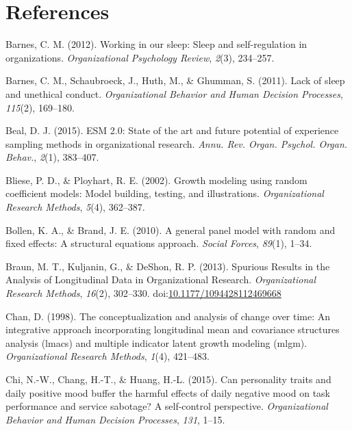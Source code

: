 \documentclass[english,,man]{apa6}
\theoremstyle{definition}
\theoremstyle{definition}
\theoremstyle{definition}
\theoremstyle{remark}
\begin{document}
\newpage

\hypertarget{references}{%
\section{References}\label{references}}

\setlength{\parindent}{-0.5in}
\setlength{\leftskip}{0.5in}

\hypertarget{refs}{}
\leavevmode\hypertarget{ref-barnes2012working}{}%
Barnes, C. M. (2012). Working in our sleep: Sleep and self-regulation in
organizations. \emph{Organizational Psychology Review}, \emph{2}(3),
234--257.

\leavevmode\hypertarget{ref-barnes_lack_2011}{}%
Barnes, C. M., Schaubroeck, J., Huth, M., \& Ghumman, S. (2011). Lack of
sleep and unethical conduct. \emph{Organizational Behavior and Human
Decision Processes}, \emph{115}(2), 169--180.

\leavevmode\hypertarget{ref-beal_esm_2015}{}%
Beal, D. J. (2015). ESM 2.0: State of the art and future potential of
experience sampling methods in organizational research. \emph{Annu. Rev.
Organ. Psychol. Organ. Behav.}, \emph{2}(1), 383--407.

\leavevmode\hypertarget{ref-bliese_growth_2002}{}%
Bliese, P. D., \& Ployhart, R. E. (2002). Growth modeling using random
coefficient models: Model building, testing, and illustrations.
\emph{Organizational Research Methods}, \emph{5}(4), 362--387.

\leavevmode\hypertarget{ref-bollen_general_2010}{}%
Bollen, K. A., \& Brand, J. E. (2010). A general panel model with random
and fixed effects: A structural equations approach. \emph{Social
Forces}, \emph{89}(1), 1--34.

\leavevmode\hypertarget{ref-braun_spurious_2013}{}%
Braun, M. T., Kuljanin, G., \& DeShon, R. P. (2013). Spurious Results in
the Analysis of Longitudinal Data in Organizational Research.
\emph{Organizational Research Methods}, \emph{16}(2), 302--330.
doi:\href{https://doi.org/10.1177/1094428112469668}{10.1177/1094428112469668}

\leavevmode\hypertarget{ref-chan1998conceptualization}{}%
Chan, D. (1998). The conceptualization and analysis of change over time:
An integrative approach incorporating longitudinal mean and covariance
structures analysis (lmacs) and multiple indicator latent growth
modeling (mlgm). \emph{Organizational Research Methods}, \emph{1}(4),
421--483.

\leavevmode\hypertarget{ref-chi_can_2015}{}%
Chi, N.-W., Chang, H.-T., \& Huang, H.-L. (2015). Can personality traits
and daily positive mood buffer the harmful effects of daily negative
mood on task performance and service sabotage? A self-control
perspective. \emph{Organizational Behavior and Human Decision
Processes}, \emph{131}, 1--15.
\end{document}
